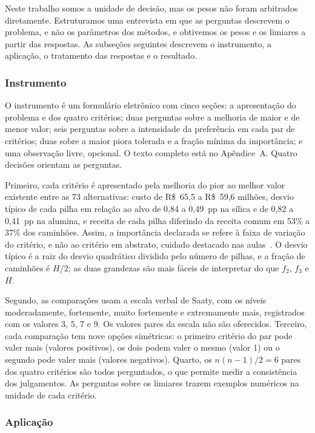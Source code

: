 \documentclass[conference]{IEEEtran}
\begin{document}
Neste trabalho somos a unidade de decisão, mas os pesos não foram arbitrados diretamente. Estruturamos uma entrevista em que as perguntas descrevem o problema, e não os parâmetros dos métodos, e obtivemos os pesos e os limiares a partir das respostas. As subseções seguintes descrevem o instrumento, a aplicação, o tratamento das respostas e o resultado.

\subsubsection{Instrumento}

O instrumento é um formulário eletrônico com cinco seções: a apresentação do problema e dos quatro critérios; duas perguntas sobre a melhoria de maior e de menor valor; seis perguntas sobre a intensidade da preferência em cada par de critérios; duas sobre a maior piora tolerada e a fração mínima da importância; e uma observação livre, opcional. O texto completo está no Apêndice~A. Quatro decisões orientam as perguntas.

Primeiro, cada critério é apresentado pela melhoria do pior ao melhor valor existente entre as 73 alternativas: custo de R\$~65{,}5 a R\$~59{,}6 milhões, desvio típico de cada pilha em relação ao alvo de 0{,}84 a 0{,}49~pp na sílica e de 0{,}82 a 0{,}41~pp na alumina, e receita de cada pilha diferindo da receita comum em 53\% a 37\% dos caminhões. Assim, a importância declarada se refere à faixa de variação do critério, e não ao critério em abstrato, cuidado destacado nas aulas~\cite{aula10}. O desvio típico é a raiz do desvio quadrático dividido pelo número de pilhas, e a fração de caminhões é $H/2$; as duas grandezas são mais fáceis de interpretar do que $f_2$, $f_3$ e $H$.

Segundo, as comparações usam a escala verbal de Saaty, com os níveis moderadamente, fortemente, muito fortemente e extremamente mais, registrados com os valores 3, 5, 7 e 9. Os valores pares da escala não são oferecidos. Terceiro, cada comparação tem nove opções simétricas: o primeiro critério do par pode valer mais (valores positivos), os dois podem valer o mesmo (valor 1) ou o segundo pode valer mais (valores negativos). Quarto, os $n(n-1)/2=6$ pares dos quatro critérios são todos perguntados, o que permite medir a consistência dos julgamentos. As perguntas sobre os limiares trazem exemplos numéricos na unidade de cada critério.

\subsubsection{Aplicação}
\end{document}
